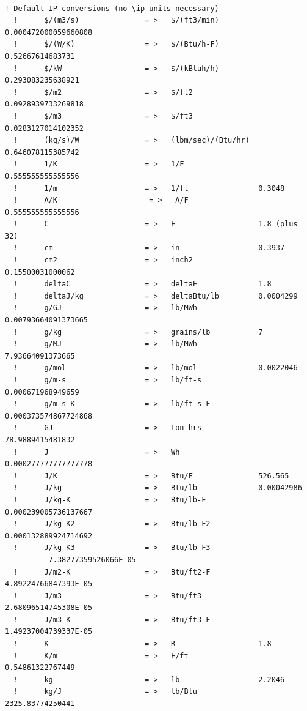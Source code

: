 \begin{lstlisting}

! Default IP conversions (no \ip-units necessary)
  !      $/(m3/s)               = >   $/(ft3/min)         0.000472000059660808
  !      $/(W/K)                = >   $/(Btu/h-F)         0.52667614683731
  !      $/kW                   = >   $/(kBtuh/h)         0.293083235638921
  !      $/m2                   = >   $/ft2               0.0928939733269818
  !      $/m3                   = >   $/ft3               0.0283127014102352
  !      (kg/s)/W               = >   (lbm/sec)/(Btu/hr)  0.646078115385742
  !      1/K                    = >   1/F                 0.555555555555556
  !      1/m                    = >   1/ft                0.3048
  !      A/K                     = >   A/F                 0.555555555555556
  !      C                      = >   F                   1.8 (plus 32)
  !      cm                     = >   in                  0.3937
  !      cm2                    = >   inch2               0.15500031000062
  !      deltaC                 = >   deltaF              1.8
  !      deltaJ/kg              = >   deltaBtu/lb         0.0004299
  !      g/GJ                   = >   lb/MWh              0.00793664091373665
  !      g/kg                   = >   grains/lb           7
  !      g/MJ                   = >   lb/MWh              7.93664091373665
  !      g/mol                  = >   lb/mol              0.0022046
  !      g/m-s                  = >   lb/ft-s             0.000671968949659
  !      g/m-s-K                = >   lb/ft-s-F           0.000373574867724868
  !      GJ                     = >   ton-hrs             78.9889415481832
  !      J                      = >   Wh                  0.000277777777777778
  !      J/K                    = >   Btu/F               526.565
  !      J/kg                   = >   Btu/lb              0.00042986
  !      J/kg-K                 = >   Btu/lb-F            0.000239005736137667
  !      J/kg-K2                = >   Btu/lb-F2           0.000132889924714692
  !      J/kg-K3                = >   Btu/lb-F3           7.38277359526066E-05
  !      J/m2-K                 = >   Btu/ft2-F           4.89224766847393E-05
  !      J/m3                   = >   Btu/ft3             2.68096514745308E-05
  !      J/m3-K                 = >   Btu/ft3-F           1.49237004739337E-05
  !      K                      = >   R                   1.8
  !      K/m                    = >   F/ft                0.54861322767449
  !      kg                     = >   lb                  2.2046
  !      kg/J                   = >   lb/Btu              2325.83774250441

\end{lstlisting}
